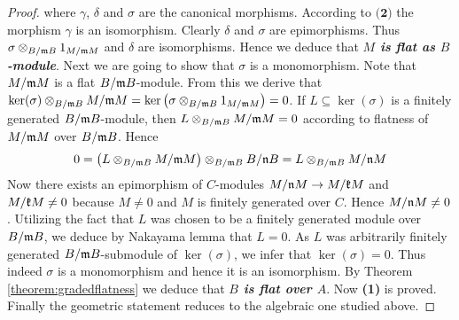 \begin{proof}
where $\gamma$, $\delta$ and $\sigma$ are the canonical morphisms. According to $\textbf{(2)}$ the morphism $\gamma$ is an isomorphism. Clearly $\delta$ and $\sigma$ are epimorphisms. Thus $\sigma \otimes_{B/\mathfrak{m}B}1_{M/\mathfrak{m}M}$ and $\delta$ are isomorphisms. Hence we deduce that \textit{\textbf{$M$ is flat as $B$-module}}. Next we are going to show that $\sigma$ is a monomorphism. Note  that $M/\mathfrak{m}M$ is a flat $B/\mathfrak{m}B$-module. From this we derive that $\mathrm{ker}(\sigma)\otimes_{B/\mathfrak{m}B}M/\mathfrak{m}M=
\ker\left(\sigma \otimes_{B/\mathfrak{m}B}1_{M/\mathfrak{m}M}\right)=0$. If $L\subseteq \ker(\sigma)$ is a finitely generated $B/\mathfrak{m}B$-module, then $L\otimes_{B/\mathfrak{m}B}M/\mathfrak{m}M=0$ according to flatness of $M/\mathfrak{m}M$ over $B/\mathfrak{m}B$. Hence 
$$0=\left(L\otimes_{B/\mathfrak{m}B}M/\mathfrak{m}M\right)\otimes_{B/\mathfrak{m}B}B/\mathfrak{n}B= L\otimes_{B/\mathfrak{m}B}M/\mathfrak{n}M$$
Now there exists an epimorphism of $C$-modules $M/\mathfrak{n}M\rightarrow M/\mathfrak{k}M$ and $M/\mathfrak{k}M\neq 0$ because $M\neq 0$ and $M$ is finitely generated over $C$. Hence $M/\mathfrak{n}M\neq 0$. Utilizing the fact that $L$ was chosen to be a finitely generated module over $B/\mathfrak{m}B$, we deduce by Nakayama lemma that $L=0$. As $L$ was arbitrarily finitely generated $B/\mathfrak{m}B$-submodule of $\ker(\sigma)$, we infer that $\ker(\sigma)=0$.
Thus indeed $\sigma$ is a monomorphism and hence it is an isomorphism. By Theorem \ref{theorem:gradedflatness} we deduce that \textit{\textbf{$B$ is flat over $A$}}. Now \textbf{(1)} is proved.\\
Finally the geometric statement reduces to the algebraic one studied above.
\end{proof}
\small


